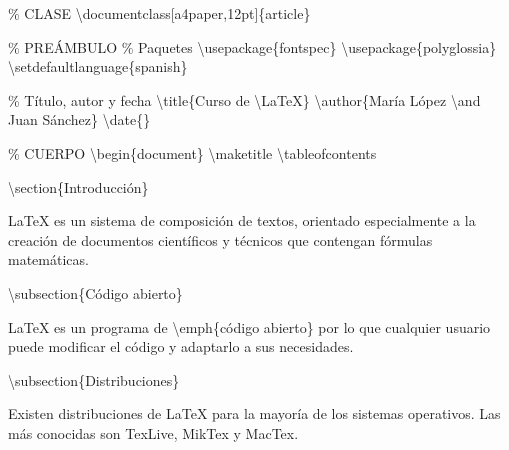 \documentclass[
  a4paper,
]{scrreport}
\newenvironment{Shaded}{\begin{snugshade}}{\end{snugshade}}
\newcommand{\BuiltInTok}[1]{\textcolor[rgb]{0.00,0.23,0.31}{#1}}
\newcommand{\CommentTok}[1]{\textcolor[rgb]{0.37,0.37,0.37}{#1}}
\newcommand{\ExtensionTok}[1]{\textcolor[rgb]{0.00,0.23,0.31}{#1}}
\newcommand{\FunctionTok}[1]{\textcolor[rgb]{0.28,0.35,0.67}{#1}}
\newcommand{\KeywordTok}[1]{\textcolor[rgb]{0.00,0.23,0.31}{#1}}
\newcommand{\NormalTok}[1]{\textcolor[rgb]{0.00,0.23,0.31}{#1}}
\theoremstyle{definition}
\theoremstyle{remark}
\begin{document}
\begin{tcolorbox}[enhanced jigsaw, left=2mm, colbacktitle=quarto-callout-tip-color!10!white, toprule=.15mm, coltitle=black, leftrule=.75mm, arc=.35mm, colback=white, opacitybacktitle=0.6, rightrule=.15mm, colframe=quarto-callout-tip-color-frame, title=\textcolor{quarto-callout-tip-color}{\faLightbulb}\hspace{0.5em}{Solución}, bottomrule=.15mm, breakable, opacityback=0, bottomtitle=1mm, toptitle=1mm, titlerule=0mm]

\begin{Shaded}
\begin{Highlighting}[]
\CommentTok{\% CLASE}
\BuiltInTok{\textbackslash{}documentclass}\NormalTok{[a4paper,12pt]\{}\ExtensionTok{article}\NormalTok{\}}

\CommentTok{\% PREÁMBULO}
\CommentTok{\% Paquetes}
\BuiltInTok{\textbackslash{}usepackage}\NormalTok{\{}\ExtensionTok{fontspec}\NormalTok{\}}
\BuiltInTok{\textbackslash{}usepackage}\NormalTok{\{}\ExtensionTok{polyglossia}\NormalTok{\}}
\FunctionTok{\textbackslash{}setdefaultlanguage}\NormalTok{\{spanish\}}

\CommentTok{\% Título, autor y fecha}
\FunctionTok{\textbackslash{}title}\NormalTok{\{Curso de }\FunctionTok{\textbackslash{}LaTeX}\NormalTok{\}}
\FunctionTok{\textbackslash{}author}\NormalTok{\{María López }\FunctionTok{\textbackslash{}and}\NormalTok{ Juan Sánchez\}}
\FunctionTok{\textbackslash{}date}\NormalTok{\{\}}

\CommentTok{\% CUERPO}
\KeywordTok{\textbackslash{}begin}\NormalTok{\{}\ExtensionTok{document}\NormalTok{\}}
\FunctionTok{\textbackslash{}maketitle}
\FunctionTok{\textbackslash{}tableofcontents}

\KeywordTok{\textbackslash{}section}\NormalTok{\{Introducción\}}

\NormalTok{LaTeX es un sistema de composición de textos, orientado especialmente a la creación de documentos científicos y técnicos que contengan fórmulas matemáticas.}

\KeywordTok{\textbackslash{}subsection}\NormalTok{\{Código abierto\}}

\NormalTok{LaTeX es un programa de }\FunctionTok{\textbackslash{}emph}\NormalTok{\{código abierto\} por lo que cualquier usuario puede modificar el código y adaptarlo a sus necesidades.}

\KeywordTok{\textbackslash{}subsection}\NormalTok{\{Distribuciones\}}

\NormalTok{Existen distribuciones de LaTeX para la mayoría de los sistemas operativos. Las más conocidas son TexLive, MikTex y MacTex.}


\end{Highlighting}
\end{Shaded}
\end{tcolorbox}
\end{document}
